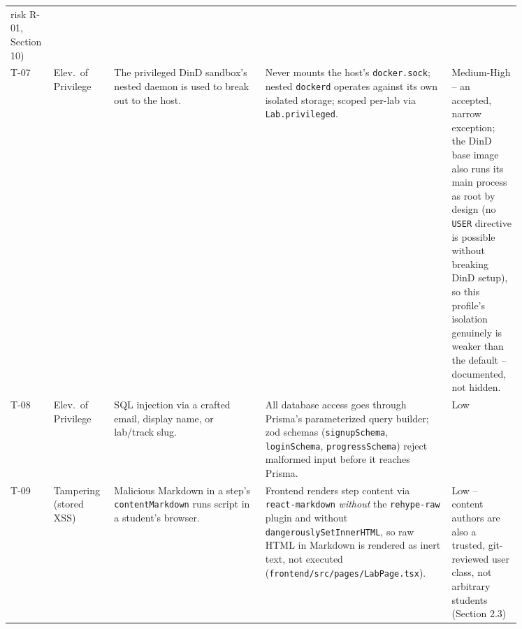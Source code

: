 \documentclass[11pt]{article}
\begin{document}
\begin{longtable}{@{}p{0.05\linewidth}p{0.09\linewidth}p{0.27\linewidth}p{0.33\linewidth}p{0.11\linewidth}@{}}
       risk R-01, Section 10) \\
T-07 & Elev.\ of Privilege & The privileged DinD sandbox's nested
       daemon is used to break out to the host. & Never mounts the
       host's \texttt{docker.sock}; nested \texttt{dockerd} operates
       against its own isolated storage; scoped per-lab via
       \texttt{Lab.privileged}. & Medium-High -- an accepted, narrow
       exception; the DinD base image also runs its main process as
       root by design (no \texttt{USER} directive is possible without
       breaking DinD setup), so this profile's isolation genuinely is
       weaker than the default -- documented, not hidden. \\
T-08 & Elev.\ of Privilege & SQL injection via a crafted email,
       display name, or lab/track slug. & All database access goes
       through Prisma's parameterized query builder; zod schemas
       (\texttt{signupSchema}, \texttt{loginSchema},
       \texttt{progressSchema}) reject malformed input before it
       reaches Prisma. & Low \\
T-09 & Tampering (stored XSS) & Malicious Markdown in a step's
       \texttt{contentMarkdown} runs script in a student's browser. &
       Frontend renders step content via \texttt{react-markdown}
       \emph{without} the \texttt{rehype-raw} plugin and without
       \texttt{dangerouslySetInnerHTML}, so raw HTML in Markdown is
       rendered as inert text, not executed
       (\texttt{frontend/src/pages/LabPage.tsx}). & Low -- content
       authors are also a trusted, git-reviewed user class, not
       arbitrary students (Section 2.3) \\
\bottomrule
\end{longtable}
\end{document}
